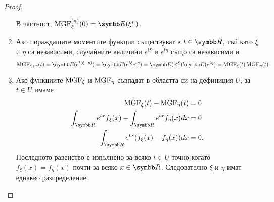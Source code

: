 \documentclass[numbers=endperiod, bibliography=totocnumbered]{scrartcl}
\begin{document}
\begin{proof}
\begin{enumerate}
    В частност, \( \MGF^{(n)}_\xi(0) = \Expect(\xi^n) \).

    \item Ако пораждащите моментите функции съществуват в \( t \in \R \), тъй като \( \xi \) и \( \eta \) са независими, случайните величини \( e^{t\xi} \) и \( e^{t\eta} \) също са независими и
    \begin{equation*}
      \MGF_{\xi + \eta}(t)
      =
      \Expect(e^{t(\xi + \eta)})
      =
      \Expect(e^{t\xi} e^{t\eta})
      =
      \Expect(e^{t\xi}) \Expect(e^{t\eta})
      =
      \MGF_\xi(t) \MGF_\eta(t).
    \end{equation*}

    \item Ако функциите \( \operatorname{MGF}_\xi \) и \( \operatorname{MGF}_\eta \) съвпадат в областта си на дефиниция \( U \), за \( t \in U \) имаме
    \begin{align*}
      \MGF_\xi(t) - \MGF_\eta(t) &= 0
      \\
      \int_{\R} e^{tx} f_\xi(x) - \int_{\R} e^{tx} f_\eta(x) dx &= 0
      \\
      \int_{\R} e^{tx} (f_\xi(x) - f_\eta(x)) dx &= 0.
    \end{align*}
    Последното равенство е изпълнено за всяко \( t \in U \) точно когато \( f_\xi(x) = f_\eta(x) \) почти за всяко \( x \in \R \). Следователно \( \xi \) и \( \eta \) имат еднакво разпределение.
  \end{enumerate}
\end{proof}
\end{document}
